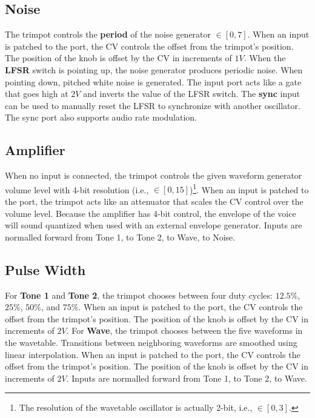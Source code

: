 \documentclass[12pt,letter]{article}
\begin{document}
\subsection{Noise}

The trimpot controls the \textbf{period} of the noise generator $\in [0, 7]$. When an input is patched to the port, the CV controls the offset from the trimpot's position. The position of the knob is offset by the CV in increments of $1V$. When the \textbf{LFSR} switch is pointing up, the noise generator produces periodic noise. When pointing down, pitched white noise is generated. The input port acts like a gate that goes high at $2V$ and inverts the value of the LFSR switch. The \textbf{sync} input can be used to manually reset the LFSR to synchronize with another oscillator. The sync port also supports audio rate modulation.

\subsection{Amplifier}

When no input is connected, the trimpot controls the given waveform generator volume level with 4-bit resolution (i.e., $\in [0, 15]$)\footnote{The resolution of the wavetable oscillator is actually 2-bit, i.e., $\in [0, 3]$.}. When an input is patched to the port, the trimpot acts like an attenuator that scales the CV control over the volume level. Because the amplifier has 4-bit control, the envelope of the voice will sound quantized when used with an external envelope generator. Inputs are normalled forward from Tone 1, to Tone 2, to Wave, to Noise.

\subsection{Pulse Width}

For \textbf{Tone 1} and \textbf{Tone 2}, the trimpot chooses between four duty cycles: $12.5\%$, $25\%$, $50\%$, and $75\%$. When an input is patched to the port, the CV controls the offset from the trimpot's position. The position of the knob is offset by the CV in increments of $2V$. For \textbf{Wave}, the trimpot chooses between the five waveforms in the wavetable. Transitions between neighboring waveforms are smoothed using linear interpolation. When an input is patched to the port, the CV controls the offset from the trimpot's position. The position of the knob is offset by the CV in increments of $2V$. Inputs are normalled forward from Tone 1, to Tone 2, to Wave.
\end{document}
